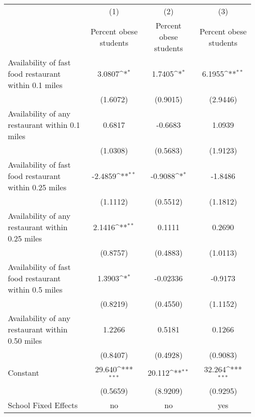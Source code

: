 {
\def\sym#1{\ifmmode^{#1}\else\(^{#1}\)\fi}
\begin{tabular}{l*{3}{c}}
\hline\hline
                    &\multicolumn{1}{c}{(1)}&\multicolumn{1}{c}{(2)}&\multicolumn{1}{c}{(3)}\\
                    &\multicolumn{1}{c}{Percent obese students}&\multicolumn{1}{c}{Percent obese students}&\multicolumn{1}{c}{Percent obese students}\\
\hline
Availability of fast food restaurant within 0.1 miles&      3.0807\sym{*}  &      1.7405\sym{*}  &      6.1955\sym{**} \\
                    &    (1.6072)         &    (0.9015)         &    (2.9446)         \\
[1em]
Availability of any restaurant within 0.1 miles&      0.6817         &     -0.6683         &      1.0939         \\
                    &    (1.0308)         &    (0.5683)         &    (1.9123)         \\
[1em]
Availability of fast food restaurant within 0.25 miles&     -2.4859\sym{**} &     -0.9088\sym{*}  &     -1.8486         \\
                    &    (1.1112)         &    (0.5512)         &    (1.1812)         \\
[1em]
Availability of any restaurant within 0.25 miles&      2.1416\sym{**} &      0.1111         &      0.2690         \\
                    &    (0.8757)         &    (0.4883)         &    (1.0113)         \\
[1em]
Availability of fast food restaurant within 0.5 miles&      1.3903\sym{*}  &    -0.02336         &     -0.9173         \\
                    &    (0.8219)         &    (0.4550)         &    (1.1152)         \\
[1em]
Availability of any restaurant within 0.50 miles&      1.2266         &      0.5181         &      0.1266         \\
                    &    (0.8407)         &    (0.4928)         &    (0.9083)         \\
[1em]
Constant            &      29.640\sym{***}&      20.112\sym{**} &      32.264\sym{***}\\
                    &    (0.5659)         &    (8.9209)         &    (0.9295)         \\
\hline
School Fixed Effects&          no         &          no         &         yes         \\

\end{tabular}}
